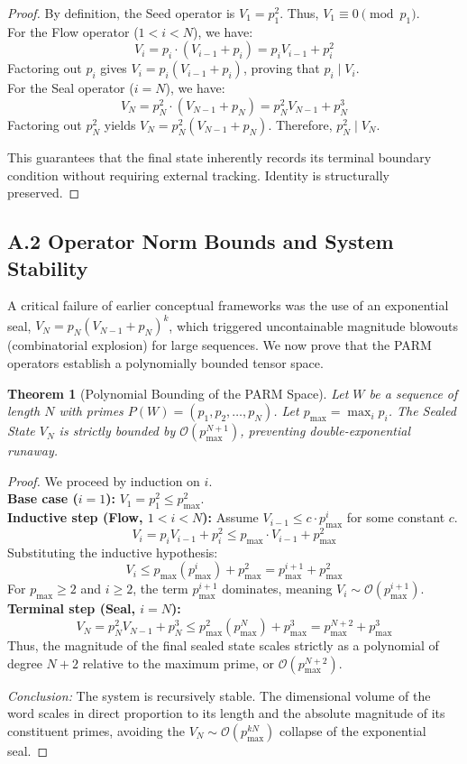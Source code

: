 \documentclass[11pt]{article}
\begin{document}
\begin{proof}
By definition, the Seed operator is $V_1 = p_1^2$. Thus, $V_1 \equiv 0 \pmod{p_1}$. \\
For the Flow operator ($1 < i < N$), we have:
\[
V_i = p_i \cdot (V_{i-1} + p_i) = p_i V_{i-1} + p_i^2
\]
Factoring out $p_i$ gives $V_i = p_i(V_{i-1} + p_i)$, proving that $p_i \mid V_i$. \\
For the Seal operator ($i = N$), we have:
\[
V_N = p_N^2 \cdot (V_{N-1} + p_N) = p_N^2 V_{N-1} + p_N^3
\]
Factoring out $p_N^2$ yields $V_N = p_N^2(V_{N-1} + p_N)$. Therefore, $p_N^2 \mid V_N$. 

This guarantees that the final state inherently records its terminal boundary condition without requiring external tracking. Identity is structurally preserved.
\end{proof}

\subsection*{A.2 Operator Norm Bounds and System Stability}

A critical failure of earlier conceptual frameworks was the use of an exponential seal, $V_N = p_N (V_{N-1} + p_N)^k$, which triggered uncontainable magnitude blowouts (combinatorial explosion) for large sequences. We now prove that the PARM operators establish a polynomially bounded tensor space.

\newtheorem{theorem}{Theorem}[section]
\begin{theorem}[Polynomial Bounding of the PARM Space]
Let $W$ be a sequence of length $N$ with primes $P(W) = (p_1, p_2, \dots, p_N)$. Let $p_{\max} = \max_{i} p_i$. The Sealed State $V_N$ is strictly bounded by $\mathcal{O}(p_{\max}^{N+1})$, preventing double-exponential runaway.
\end{theorem}

\begin{proof}
We proceed by induction on $i$. \\
\textbf{Base case ($i=1$):} $V_1 = p_1^2 \le p_{\max}^2$. \\
\textbf{Inductive step (Flow, $1 < i < N$):} Assume $V_{i-1} \le c \cdot p_{\max}^i$ for some constant $c$.
\[
V_i = p_i V_{i-1} + p_i^2 \le p_{\max} \cdot V_{i-1} + p_{\max}^2
\]
Substituting the inductive hypothesis:
\[
V_i \le p_{\max} (p_{\max}^i) + p_{\max}^2 = p_{\max}^{i+1} + p_{\max}^2
\]
For $p_{\max} \ge 2$ and $i \ge 2$, the term $p_{\max}^{i+1}$ dominates, meaning $V_i \sim \mathcal{O}(p_{\max}^{i+1})$. \\
\textbf{Terminal step (Seal, $i=N$):}
\[
V_N = p_N^2 V_{N-1} + p_N^3 \le p_{\max}^2 (p_{\max}^N) + p_{\max}^3 = p_{\max}^{N+2} + p_{\max}^3
\]
Thus, the magnitude of the final sealed state scales strictly as a polynomial of degree $N+2$ relative to the maximum prime, or $\mathcal{O}(p_{\max}^{N+2})$. 

\textit{Conclusion:} The system is recursively stable. The dimensional volume of the word scales in direct proportion to its length and the absolute magnitude of its constituent primes, avoiding the $V_N \sim \mathcal{O}(p_{\max}^{kN})$ collapse of the exponential seal.
\end{proof}
\end{document}

